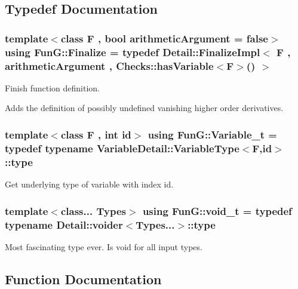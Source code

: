 \subsection{Typedef Documentation}
\hypertarget{namespaceFunG_ab2a52dfbc62e262c67f293fda5f81ef7}{}
\subsubsection[{Finalize}]{\setlength{\rightskip}{0pt plus 5cm}template$<$class F , bool arithmetic\+Argument = false$>$ using {\bf Fun\+G\+::\+Finalize} = typedef Detail\+::\+Finalize\+Impl$<$ F , arithmetic\+Argument , {\bf Checks\+::has\+Variable}$<$F$>$() $>$}\label{namespaceFunG_ab2a52dfbc62e262c67f293fda5f81ef7}


Finish function definition. 

Adds the definition of possibly undefined vanishing higher order derivatives. \hypertarget{namespaceFunG_a3d589ef7d011a46a72847eabcbbb4532}{}
\subsubsection[{Variable\+\_\+t}]{\setlength{\rightskip}{0pt plus 5cm}template$<$class F , int id$>$ using {\bf Fun\+G\+::\+Variable\+\_\+t} = typedef typename Variable\+Detail\+::\+Variable\+Type$<$F,id$>$\+::type}\label{namespaceFunG_a3d589ef7d011a46a72847eabcbbb4532}


Get underlying type of variable with index id. 

\hypertarget{namespaceFunG_a0cde667596590eb8d32e4a5ee76ddbb9}{}
\subsubsection[{void\+\_\+t}]{\setlength{\rightskip}{0pt plus 5cm}template$<$class... Types$>$ using {\bf Fun\+G\+::void\+\_\+t} = typedef typename Detail\+::voider$<$Types...$>$\+::type}\label{namespaceFunG_a0cde667596590eb8d32e4a5ee76ddbb9}


Most fascinating type ever. Is void for all input types. 



\subsection{Function Documentation}
\hypertarget{namespaceFunG_a0211d0d26c669d56b5113fd2292902e5}{}
